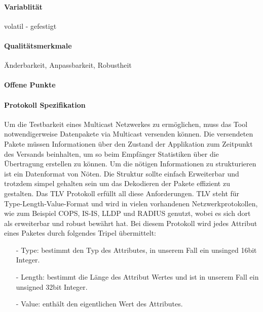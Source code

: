 \paragraph{Variablität}
volatil - gefestigt
\paragraph{Qualitätsmerkmale}
Änderbarkeit, Anpassbarkeit, Robustheit
\paragraph{Offene Punkte}

\paragraph{Protokoll Spezifikation}

Um die Testbarkeit eines Multicast Netzwerkes zu ermöglichen, muss das Tool notwendigerweise
Datenpakete via Multicast versenden können. Die versendeten Pakete müssen Informationen über den
Zustand der Applikation zum Zeitpunkt des Versands beinhalten, um so beim Empfänger
Statistiken über die Übertragung erstellen zu können. Um die nötigen Informationen
zu strukturieren ist ein Datenformat von Nöten. Die Struktur sollte einfach
Erweiterbar und trotzdem simpel gehalten sein um das Dekodieren der Pakete 
effizient zu gestalten. Das TLV Protokoll erfüllt all diese Anforderungen.
TLV steht für Type-Length-Value-Format und wird in vielen vorhandenen 
Netzwerkprotokollen, wie zum Beispiel COPS, IS-IS, LLDP und RADIUS genutzt,
wobei es sich dort als erweiterbar und robust bewährt hat.
Bei diesem Protokoll wird jedes Attribut eines Paketes durch folgendes Tripel übermittelt:

\begin{itemize}
 \item[-] Type: bestimmt den Typ des Attributes, in unserem Fall ein unsinged 
                16bit Integer.
 \item[-] Length: bestimmt die Länge des Attribut Wertes und ist 
                  in unserem Fall ein unsigned 32bit Integer.
 \item[-] Value: enthält den eigentlichen Wert des Attributes.
\end{itemize}

